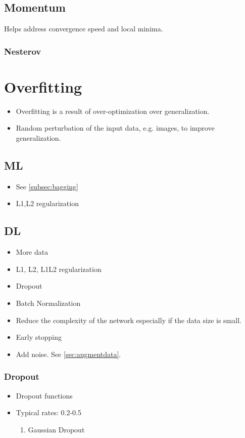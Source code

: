 \documentclass[a4paper, 12pt]{report}
\begin{document}
\section{Momentum}
Helps address convergence speed and local minima.

\subsection{Nesterov}

\chapter{Overfitting}
\begin{itemize}
\item Overfitting is a result of over-optimization over generalization.
\item Random perturbation of the input data, e.g. images, to improve generalization.
\end{itemize}
\section{ML}
\begin{itemize}
\item See  \autoref{subsec:bagging}
\item L1,L2 regularization
\end{itemize}

\section{DL}
\begin{itemize}
\item More data
\item L1, L2, L1L2 regularization
\item Dropout
\item Batch Normalization
\item Reduce the complexity of the network especially if the data size is small.
\item Early stopping
\item Add noise. See  \autoref{sec:augmentdata}.
\end{itemize}

\subsection{Dropout}
\begin{itemize}
\item Dropout functions
\item Typical rates: 0.2-0.5
\begin{enumerate}
\item Gaussian Dropout
\end{enumerate}
\end{itemize}
\end{document}
